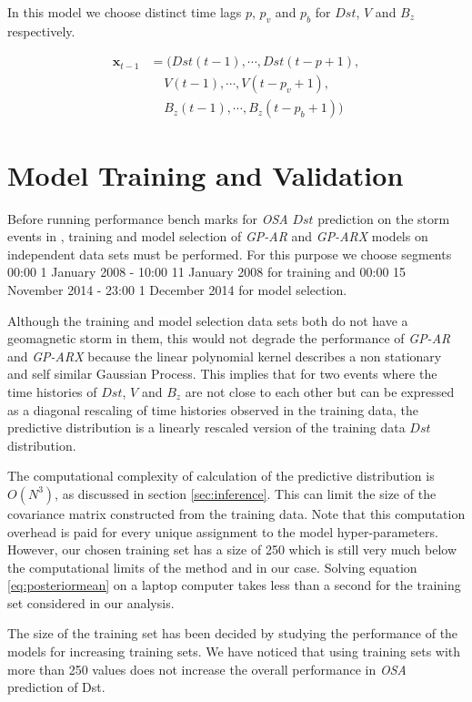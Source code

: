 \documentclass[draft,sw]{AGUTeX}
\begin{document}
\begin{article}
In this model we choose distinct time lags $p$, $p_{v}$ and $p_{b}$ for $Dst$, $V$ and $B_z$ respectively.
    
\begin{align*}
       \mathbf{x}_{t-1} & = (Dst(t-1), \cdots , Dst(t-p+1), \\
        & \ \ \ \ \  V(t-1), \cdots, V(t-p_{v}+1),\\
        & \ \ \ \ \  B_{z}(t-1), \cdots, B_{z}(t-p_{b}+1))
\end{align*}

\section{Model Training and Validation}

Before running performance bench marks for \emph{OSA} $Dst$ prediction on the storm events in \citet{Ji2012}, training and model selection of \emph{GP-AR} and \emph{GP-ARX} models on independent data sets must be performed. For this purpose we choose segments 00:00 1 January 2008 - 10:00 11 January 2008 for training and 00:00 15 November 2014 - 23:00 1 December 2014 for model selection. 

Although the training and model selection data sets both do not have a geomagnetic storm in them, this would not degrade the performance of \emph{GP-AR} and \emph{GP-ARX} because the linear polynomial kernel describes a non stationary and self similar Gaussian Process. This implies that for two events where the time histories of $Dst$, $V$ and $B_z$ are not close to each other but can be expressed as a diagonal rescaling of time histories observed in the training data, the predictive distribution is a linearly rescaled version of the training data $Dst$ distribution. 

The computational complexity of calculation of the predictive distribution is $O(N^3)$, as discussed in section \ref{sec:inference}. This can limit the size of the covariance matrix constructed from the training data. Note that this computation overhead is paid for every unique assignment to the model hyper-parameters. However, our chosen training set has a size of 250 which is still very much below the computational limits of the method and in our case. Solving equation \ref{eq:posteriormean} on a laptop computer takes less than a second for the training set considered in our analysis. 

The size of the training set has been decided by studying the performance of the models for increasing training sets. We have noticed that using training sets with more than 250 values does not increase the overall performance in \emph{OSA} prediction of Dst. 



\end{article}
\end{document}
